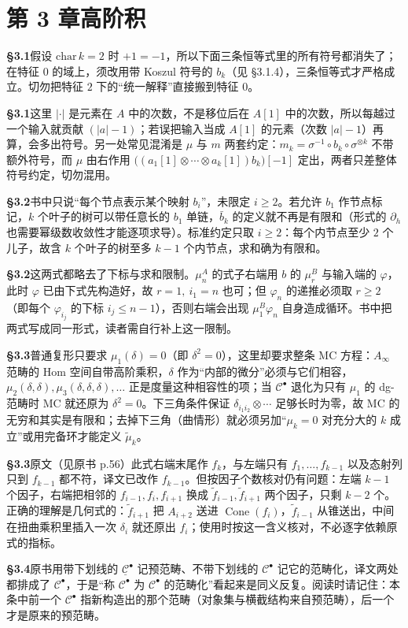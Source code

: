 \section*{第 3 章\quad 高阶积}
\noindent\textbf{§3.1}\quad 假设 $\mathrm{char}\,k=2$ 时 $+1=-1$，所以下面三条恒等式里的所有符号都消失了；在特征 $0$ 的域上，须改用带 Koszul 符号的 $b_k$（见 §3.1.4），三条恒等式才严格成立。切勿把特征 $2$ 下的“统一解释”直接搬到特征 $0$。\par\medskip
\noindent\textbf{§3.1}\quad 这里 $|\cdot|$ 是元素在 $A$ 中的次数，不是移位后在 $A[1]$ 中的次数，所以每越过一个输入就贡献 $(|a|-1)$；若误把输入当成 $A[1]$ 的元素（次数 $|a|-1$）再算，会多出符号。另一处常见混淆是 $\mu$ 与 $m$ 两套约定：$m_k=\sigma^{-1}\circ b_k\circ\sigma^{\otimes k}$ 不带额外符号，而 $\mu$ 由右作用 $\bigl((a_1[1]\otimes\cdots\otimes a_k[1])b_k\bigr)[-1]$ 定出，两者只差整体符号约定，切勿混用。\par\medskip
\noindent\textbf{§3.2}\quad 书中只说“每个节点表示某个映射 $b_i$”，未限定 $i\geq2$。若允许 $b_1$ 作节点标记，$k$ 个叶子的树可以带任意长的 $b_1$ 单链，$\bar b_k$ 的定义就不再是有限和（形式的 $\partial_h$ 也需要幂级数收敛性才能逐项求导）。标准约定只取 $i\geq2$：每个内节点至少 $2$ 个儿子，故含 $k$ 个叶子的树至多 $k-1$ 个内节点，求和确为有限和。\par\medskip
\noindent\textbf{§3.2}\quad 这两式都略去了下标与求和限制。$\mu_n^A$ 的式子右端用 $b$ 的 $\mu_r^B$ 与输入端的 $\varphi$，此时 $\varphi$ 已由下式先构造好，故 $r=1,\ i_1=n$ 也可；但 $\varphi_n$ 的递推必须取 $r\geq2$（即每个 $\varphi_{i_j}$ 的下标 $i_j\leq n-1$），否则右端会出现 $\mu_1^B\varphi_n$ 自身造成循环。书中把两式写成同一形式，读者需自行补上这一限制。\par\medskip
\noindent\textbf{§3.3}\quad 普通复形只要求 $\mu_1(\delta)=0$（即 $\delta^2=0$），这里却要求整条 MC 方程：$A_\infty$ 范畴的 Hom 空间自带高阶乘积，$\delta$ 作为“内部的微分”必须与它们相容，$\mu_2(\delta,\delta),\mu_3(\delta,\delta,\delta),\ldots$ 正是度量这种相容性的项；当 $\mathcal C^\bullet$ 退化为只有 $\mu_1$ 的 dg-范畴时 MC 就还原为 $\delta^2=0$。下三角条件保证 $\delta_{i_1i_2}\otimes\cdots$ 足够长时为零，故 MC 的无穷和其实是有限和；去掉下三角（曲情形）就必须另加“$\mu_k=0$ 对充分大的 $k$ 成立”或用完备环才能定义 $\widetilde\mu_k$。\par\medskip
\noindent\textbf{§3.3}\quad 原文（见原书 p.56）此式右端末尾作 $f_k$，与左端只有 $f_1,\ldots,f_{k-1}$ 以及态射列只到 $f_{k-1}$ 都不符，译文已改作 $f_{k-1}$。但按因子个数核对仍有问题：左端 $k-1$ 个因子，右端把相邻的 $f_{i-1},f_i,f_{i+1}$ 换成 $\widetilde f_{i-1},\widetilde f_{i+1}$ 两个因子，只剩 $k-2$ 个。正确的理解是几何式的：$\widetilde f_{i+1}$ 把 $A_{i+2}$ 送进 $\operatorname{Cone}(f_i)$，$\widetilde f_{i-1}$ 从锥送出，中间在扭曲乘积里插入一次 $\delta_i$ 就还原出 $f_i$；使用时按这一含义核对，不必逐字依赖原式的指标。\par\medskip
\noindent\textbf{§3.4}\quad 原书用带下划线的 $\underline{\mathcal C}^\bullet$ 记预范畴、不带下划线的 $\mathcal C^\bullet$ 记它的范畴化，译文两处都排成了 $\mathcal C^\bullet$，于是“称 $\mathcal C^\bullet$ 为 $\mathcal C^\bullet$ 的范畴化”看起来是同义反复。阅读时请记住：本条中前一个 $\mathcal C^\bullet$ 指新构造出的那个范畴（对象集与横截结构来自预范畴），后一个才是原来的预范畴。\par\medskip
